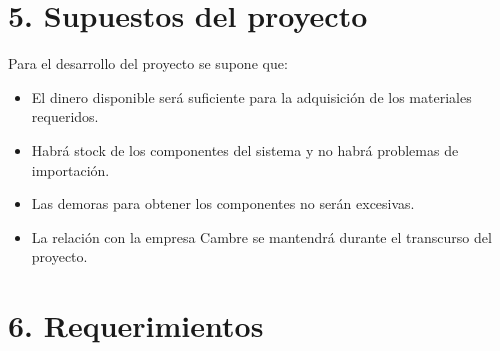 \documentclass[
11pt, %
codirector, %
]{charter}
\begin{document}
\section{5. Supuestos del proyecto}
\label{sec:supuestos}

Para el desarrollo del proyecto se supone que:

\begin{itemize}
	\item El dinero disponible será suficiente para la adquisición de los materiales requeridos.
	\item Habrá stock de los componentes del sistema y no habrá problemas de importación.
	\item Las demoras para obtener los componentes no serán excesivas.
	\item La relación con la empresa Cambre se mantendrá durante el transcurso del proyecto.
\end{itemize}

\section{6. Requerimientos}
\label{sec:requerimientos}

\newcommand{\leadingZeroes}[1]{%
\ifnum #1<100{0}\fi%
\ifnum #1<10{0}\fi%
#1}
%
%
\newcommand{\REQ}{%
\stepcounter{REQ}%
\textbf{[SFVI-REQ{\leadingZeroes{\theREQ}]}}}
%
\end{document}
